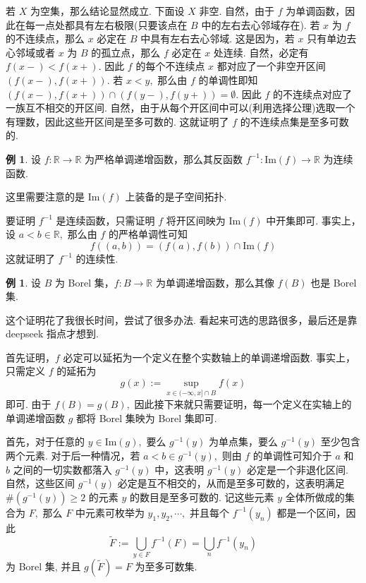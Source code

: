 \documentclass[12pt, a4paper, oneside]{book}
\numberwithin{figure}{section}
\theoremstyle{definition}
\newtheorem{example}[theorem]{例}
\begin{document}
若 $X$ 为空集，那么结论显然成立. 下面设 $X$ 非空.
自然，由于 $f$ 为单调函数，因此在每一点处都具有左右极限(只要该点在 $B$ 中的左右去心邻域存在).  若 $x$ 为 $f$ 的不连续点，那么 $x$ 必定在 $B$ 中具有左右去心邻域. 这是因为，若 $x$ 只有单边去心邻域或者 $x$ 为 $B$ 的孤立点，那么 $f$ 必定在 $x$ 处连续. 
自然，必定有 $f(x-)<f(x+).$ 因此 $f$ 的每个不连续点 $x$ 都对应了一个非空开区间 $(f(x-),f(x+)).$ 
若 $x<y,$ 那么由 $f$ 的单调性即知 $(f(x-),f(x+))\cap (f(y-),f(y+))=\emptyset.$ 因此 $f$ 的不连续点对应了一族互不相交的开区间. 自然，由于从每个开区间中可以(利用选择公理)选取一个有理数，因此这些开区间是至多可数的. 这就证明了 $f$ 的不连续点集是至多可数的. 

\begin{example}\label{ex:strictly_monotone_function_inverse_continuous}
    设 $f:\mathbb R\to\mathbb R$ 为严格单调递增函数，那么其反函数 $f^{-1}:\mathrm{Im}(f)\to \mathbb R$ 为连续函数. 
\end{example}

这里需要注意的是 $\mathrm{Im}(f)$ 上装备的是子空间拓扑. 

要证明 $f^{-1}$ 是连续函数，只需证明 $f$ 将开区间映为 $\mathrm{Im}(f)$ 中开集即可. 事实上，设 $a<b\in\mathbb R,$ 那么由 $f$ 的严格单调性可知 
\begin{equation}
    f((a,b))=(f(a),f(b))\cap\mathrm{Im}(f)
\end{equation}
这就证明了 $f^{-1}$ 的连续性. 

\begin{example}\label{ex:monotone_function_maps_Borel_set_to_Borel_set}
    设 $B$ 为 Borel 集，$f:B\to\mathbb R$ 为单调递增函数，那么其像 $f(B)$ 也是 Borel 集.
\end{example}

这个证明花了我很长时间，尝试了很多办法. 看起来可选的思路很多，最后还是靠 deepseek 指点才想到. 

首先证明，$f$ 必定可以延拓为一个定义在整个实数轴上的单调递增函数. 事实上，只需定义 $f$ 的延拓为 
\begin{equation}
    g(x):=\sup_{x\in (-\infty,x]\cap B} f(x)
\end{equation}
即可. 由于 $f(B)=g(B),$ 因此接下来就只需要证明，每一个定义在实轴上的单调递增函数 $g$ 都将 Borel 集映为 Borel 集即可. 

首先，对于任意的 $y\in \mathrm{Im}(g),$ 要么 $g^{-1}(y)$ 为单点集，要么 $g^{-1}(y)$ 至少包含两个元素. 对于后一种情况，若 $a<b\in g^{-1}(y),$ 则由 $f$ 的单调性可知介于 $a$ 和 $b$ 之间的一切实数都落入 $g^{-1}(y)$ 中，这表明 $g^{-1}(y)$ 必定是一个非退化区间. 
自然，这些区间 $g^{-1}(y)$ 必定是互不相交的，从而是至多可数的，这表明满足 $\#(g^{-1}(y))\geq 2$ 的元素 $y$ 的数目是至多可数的.
记这些元素 $y$ 全体所做成的集合为 $F,$ 那么 $F$ 中元素可枚举为 $y_1,y_2,\cdots,$ 并且每个 $f^{-1}(y_n)$ 都是一个区间，因此 
\begin{equation}
    \tilde F:=\bigcup_{y\in F}f^{-1}(F)=\bigcup_{n}f^{-1}(y_n)
\end{equation}
为 Borel 集, 并且 $g(\tilde F)=F$ 为至多可数集.
\end{document}
